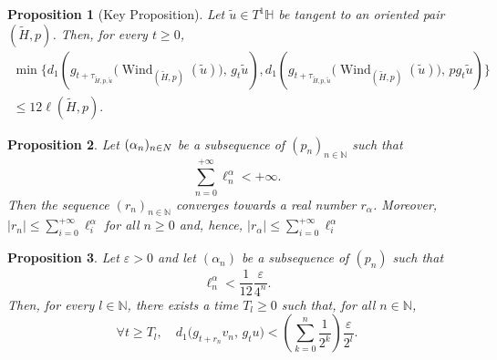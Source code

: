 \documentclass[10pt,a4paper]{amsart}
\newtheorem{proposition}{Proposition}
\renewcommand{\H}{\mathbb{H}}
\newcommand{\N}{\mathbb{N}} %
\begin{document}
 \begin{proposition}[Key Proposition]\label{key_prop} 
 	Let $\tilde u\in T^1 \H$ be tangent to an oriented pair $(\tilde H, p)$.  	
 	Then, for every $t\ge 0$,
 	\begin{align*}
 		\min \{ d_1\!\left(g_{t+\tau_{\tilde H, p ,\tilde u}}\bigl(\operatorname{Wind}_{(\tilde H, p )}(\tilde u)\bigr),\, g_t\tilde u\right),
 		d_1\!\left(g_{t+\tau_{\tilde H, p ,\tilde u}}\bigl(\operatorname{Wind}_{(\tilde H, p )}(\tilde u)\bigr),\, p g_t\tilde u\right)
 		\}
 		\\ \le 12 \ell(\tilde H, p).
 	\end{align*}
 	
 \end{proposition}

\begin{proposition}\label{convergence_winding_time}
	Let $(\alpha_n)_{n\in\\N}$ be a subsequence of $(p_n)_{n\in \N}$ such that \[ \sum_{n=0}^{+\infty} \ell_n^{\alpha} < +\infty.\] Then the sequence $(r_n)_{n\in \mathbb{N}}$ converges towards a real number $r_{\alpha}$. 
	Moreover, $|r_n|\le \sum_{i=0}^{+\infty} \ell_i^{\alpha}$ for all $n\ge 0$ and, hence, $|r_{\alpha}|\le \sum_{i=0}^{+\infty} \ell_i^{\alpha}$ 
\end{proposition}

\begin{proposition}
	Let $\varepsilon>0$ and let $(\alpha_n)$ be a subsequence of $(p_n)$ such that
	\[
	\ell_n^\alpha < \frac{1}{12}\frac{\varepsilon}{4^n}.
	\]
	Then, for every $l\in \N$, there exists a time $T_l \ge 0$ such that, for all
	$n \in \mathbb{N}$,
	\begin{equation}\label{Pm}
			\forall t\ge T_l,\quad d_1\big(g_{t+r_n} v_n,\, g_t u\big)
		<
		\left(\sum_{k=0}^{n} \frac{1}{2^k}\right)\frac{\varepsilon}{2^l}.
	\end{equation}
\end{proposition}
\end{document}
